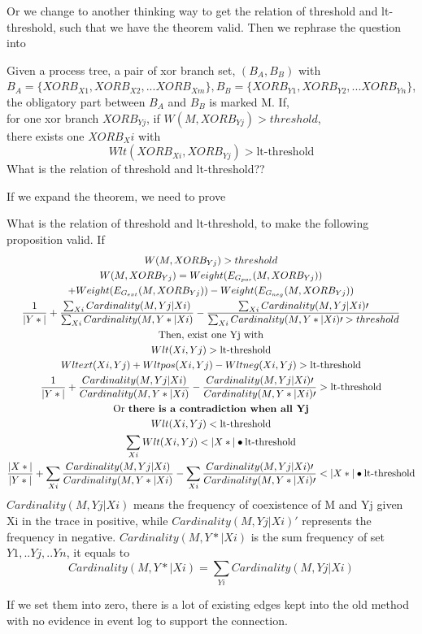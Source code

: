 Or we change to another thinking way to get the relation of threshold and lt-threshold, such that we have the theorem valid. Then we rephrase the question into
\begin{proposition}
	Given a process tree, a pair of xor branch set, $(B_A,B_B)$ with $B_A=\{XORB_{X1}, XORB_{X2},...XORB_{Xm}\}, B_B=\{XORB_{Y1}, XORB_{Y2},...XORB_{Yn}\}$, the obligatory part between $B_A$ and $B_B$ is marked M. If,\\
	for one xor branch $XORB_{Yj}$, if $W(M, XORB_{Yj}) > threshold$, \\ there exists one $XORB_Xi$ with 
	\[Wlt(XORB_{Xi}, XORB_{Yj})> \text{lt-threshold}\]
	What is the relation of threshold and lt-threshold?? 
\end{proposition}
If we expand the theorem, we need to prove 
\begin{proposition}
	What is the relation of threshold and lt-threshold, to make the following proposition valid. If 
	\begin{equation*}
	\begin{gathered}
	W(M, XORB_{Yj})  > threshold \\
	W(M, XORB_{Yj}) = Weight(E_{G_{pos}}(M, XORB_{Yj})) \\
	+ Weight(E_{G_{ext}}(M, XORB_{Yj})) 
	- Weight(E_{G_{neg}}(M, XORB_{Yj})) \\
	\frac{1}{|Y*|} + \frac{\sum_{Xi}{Cardinality(M,Yj|Xi)}} {\sum_{Xi}{Cardinality(M,Y*|Xi)}}  
	- \frac{\sum_{Xi}{Cardinality(M,Yj|Xi)\prime}} {\sum_{Xi}{Cardinality(M,Y*|Xi)\prime} > threshold} \\
	\text{Then, exist one Yj with}\\
	Wlt(Xi, Yj)> \text{lt-threshold} \\
	Wlt{ext}(Xi, Yj) + Wlt{pos}(Xi, Yj) -Wlt{neg}(Xi, Yj) > \text{lt-threshold}\\
	\frac{1}{|Y*|} + \frac{Cardinality(M,Yj|Xi)} {Cardinality(M,Y*|Xi)}  
	- \frac{Cardinality(M,Yj|Xi)\prime} {Cardinality(M,Y*|Xi)\prime} > \text{lt-threshold}  \\
	\text{Or \textbf{there is a contradiction when all Yj}}\\
	Wlt(Xi, Yj)< \text{lt-threshold}\\
	\sum_{Xi} Wlt(Xi, Yj) < |X*|\bullet \text{lt-threshold} \\
	\frac{|X*|}{|Y*|} + \sum_{Xi}\frac{Cardinality(M,Yj|Xi)} {Cardinality(M,Y*|Xi)}  
	- \sum_{Xi}\frac{Cardinality(M,Yj|Xi)\prime} {Cardinality(M,Y*|Xi)\prime} < |X*|\bullet \text{lt-threshold}  \\
	\end{gathered}
	\end{equation*}	
	$Cardinality(M,Yj|Xi)$ means the frequency of coexistence of M and Yj given Xi in the trace in positive, while $Cardinality(M,Yj|Xi)\prime$ represents the frequency in negative. $Cardinality(M,Y*|Xi)$ is the sum frequency of set ${Y1,..Yj,..Yn}$, it equals to \[Cardinality(M,Y*|Xi) = \sum_{Yi}Cardinality(M,Yj|Xi)\]
\end{proposition}
If we set them into zero, there is a lot of existing edges kept into the old method with no evidence in event log to support the connection. 

